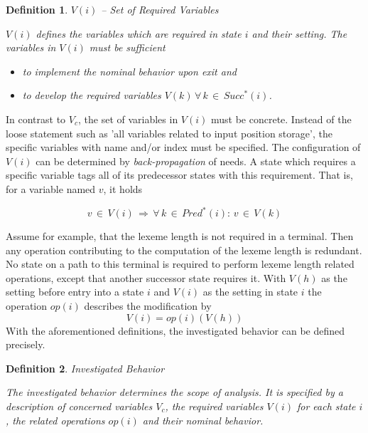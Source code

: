 \documentclass[12pt,a4paper]{scrartcl}
\newtheorem{definition}{Definition}
\begin{document}
\begin{definition}
$V(i)$ -- Set of Required Variables

$V(i)$ defines the variables which are required in state $i$ and their setting.
The variables in $V(i)$ must be sufficient

\begin{itemize}
\item to implement the nominal behavior upon exit and
\item to develop the required variables $V(k)\,\forall\,k\,\in\,Succ^*(i)$. 
\end{itemize}
\end{definition}

In contrast to $V_c$, the set of variables in $V(i)$ must be concrete.  Instead
of the loose statement such as 'all variables related to input position
storage', the specific variables with name and/or index must be specified.  The
configuration of $V(i)$ can be determined by \textit{back-propagation} of
needs. A state which requires a specific variable tags all of its predecessor
states with this requirement. That is, for a variable named $v$, it holds

\begin{equation}
    v\,\in\,V(i)\,\Rightarrow\,\forall\,k\,\in\,Pred^*(i):\,v\,\in\,V(k)
\end{equation}

Assume for example, that the lexeme length is not required in a terminal. Then
any operation contributing to the computation of the lexeme length is
redundant.  No state on a path to this terminal is required to perform lexeme
length related operations, except that another successor state requires it.  
With $V(h)$ as the setting before entry into a state $i$ and $V(i)$ as the
setting in state $i$ the operation $op(i)$ describes the modification by 
\begin{equation}
\label{eq:operation}
                         V(i) = op(i)(V(h))
\end{equation}
With the aforementioned definitions, the investigated behavior can be defined
precisely.

\begin{definition}
Investigated Behavior 

The investigated behavior determines the scope of analysis. It is
specified by a description of concerned variables $V_c$, the required
variables $V(i)$ for each state $i$, the related operations $op(i)$ and
their nominal behavior.
\end{definition}
    
\end{document}
